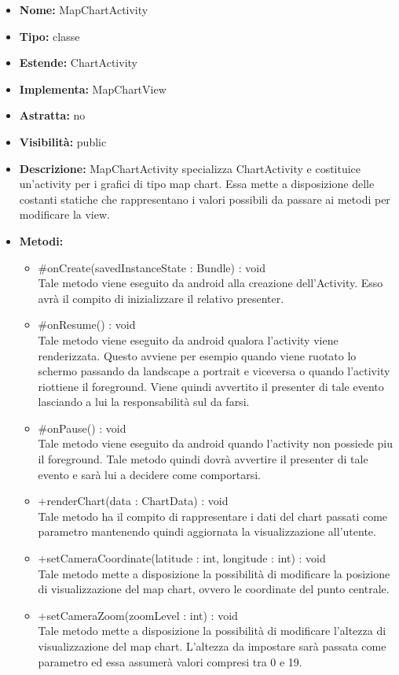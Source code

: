 			
			\begin{itemize}
			\item \textbf{Nome:} MapChartActivity
			\item \textbf{Tipo:} classe
			
		\item \textbf{Estende:}
		ChartActivity
		\item \textbf{Implementa:}
		MapChartView
		\item \textbf{Astratta:}
		no
			\item \textbf{Visibilità:} public
			\item \textbf{Descrizione:} MapChartActivity specializza ChartActivity e costituice un'activity per i grafici di tipo map chart. Essa mette a disposizione delle costanti statiche che rappresentano i valori possibili da passare ai metodi per modificare la view.
			\item \textbf{Metodi:}
				\begin{itemize}
				\setlength{\itemsep}{5pt}
				
					\item[\ding{111}] {{\#onCreate(savedInstanceState : Bundle) : void}} \\ [1mm] Tale metodo viene eseguito da android alla creazione dell'Activity. Esso avrà il compito di inizializzare il relativo presenter. 
					\item[\ding{111}] {{\#onResume() : void}} \\ [1mm] Tale metodo viene eseguito da android qualora l'activity viene renderizzata. Questo avviene per esempio quando viene ruotato lo schermo passando da landscape a portrait e viceversa o quando l'activity riottiene il foreground. Viene quindi avvertito il presenter di tale evento lasciando a lui la responsabilità sul da farsi.
					\item[\ding{111}] {{\#onPause() : void}} \\ [1mm] Tale metodo viene eseguito da android quando l'activity non possiede piu il foreground. Tale metodo quindi dovrà avvertire il presenter di tale evento e sarà lui a decidere come comportarsi.
					\item[\ding{111}] {{+renderChart(data : ChartData) : void}} \\ [1mm] Tale metodo ha il compito di rappresentare i dati del chart passati come parametro mantenendo quindi aggiornata la visualizzazione all'utente.
					\item[\ding{111}] {{+setCameraCoordinate(latitude : int, longitude : int) : void}} \\ [1mm] Tale metodo mette a disposizione la possibilità di modificare la posizione di visualizzazione del map chart, ovvero le coordinate del punto centrale.
					\item[\ding{111}] {{+setCameraZoom(zoomLevel : int) : void}} \\ [1mm] Tale metodo mette a disposizione la possibilità di modificare l'altezza di visualizzazione del map chart. L'altezza da impostare sarà passata come parametro ed essa assumerà valori compresi tra 0 e 19.
				\end{itemize}
		
			\end{itemize}

